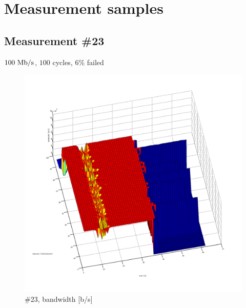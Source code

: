 
\section{Measurement samples}
\label{appendix:measurement-samples}
\subsection{Measurement \#23}
$100~\mathrm{Mb/s}$, $100$ cycles, 6\% failed
\begin{figure}[htb]
	\begin{center}
	\includegraphics[width=\textwidth]{results-239-3d.png}
	\end{center}
	\caption[]{\#23, bandwidth [b/s]}
	\label{img:results-239-3d.png}
\end{figure}

